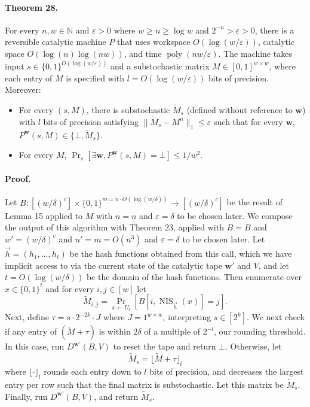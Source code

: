 \paragraph{Theorem 28.} For every $n,w\in\mathbb N$ and $\varepsilon>0$ where $w\geq n\geq\log w$ and $2^{-n}>\varepsilon>0$, there is a reversible catalytic machine $P$ that uses workspace $O(\log(w/\varepsilon))$, catalytic space $O(\log(n)\log(nw))$, and time $\operatorname{poly}(nw/\varepsilon)$. The machine takes input $s\in\{0,1\}^{O(\log(w/\varepsilon))}$ and a substochastic matrix $M\in[0,1]^{w\times w}$, where each entry of $M$ is specified with $l=O(\log(w/\varepsilon))$ bits of precision. Moreover:
\begin{itemize}
\item For every $(s,M)$, there is substochastic $\widetilde M_s$ (defined without reference to $\mathbf w$) with $l$ bits of precision satisfying $\|\widetilde M_s-M^n\|_1\leq\varepsilon$ such that for every $\mathbf w$, $P^{\mathbf w}(s,M)\in\{\bot,\widetilde M_s\}$.
\item For every $M$, $\Pr_s[\exists\mathbf w,P^{\mathbf w}(s,M)=\bot]\leq1/w^2$.
\end{itemize}
\paragraph{Proof.} Let $B:[(w/\delta)^c]\times\{0,1\}^{m=n\cdot O(\log(w/\delta))}\to[(w/\delta)^c]$ be the result of Lemma 15 applied to $M$ with $n=n$ and $\varepsilon=\delta$ to be chosen later. We compose the output of this algorithm with Theorem 23, applied with $B=B$ and $w'=(w/\delta)^c$ and $n'=m=O(n^3)$ and $\varepsilon=\delta$ to be chosen later. Let $\vec h=(h_1,\ldots,h_\ell)$ be the hash functions obtained from this call, which we have implicit access to via the current state of the catalytic tape $\mathbf w'$ and $V$, and let $t=O(\log(w/\delta))$ be the domain of the hash functions. Then enumerate over $x\in\{0,1\}^t$ and for every $i,j\in[w]$ let
\[\widetilde M_{i,j}=\Pr_{x\leftarrow U_t}[B[i,\operatorname{NIS}_{\vec h}(x)]=j].\]
Next, define $\tau=s\cdot2^{-2k}\cdot J$ where $J=1^{w\times w}$, interpreting $s\in[2^k]$. We next check if any entry of $(\widetilde M+\tau)$ is within $2\delta$ of a multiple of $2^{-l}$, our rounding threshold. In this case, run $D^{\mathbf w'}(B,V)$ to reset the tape and return $\bot$. Otherwise, let
\[\widetilde M_s=\lfloor\widetilde M+\tau\rfloor_l\]
where $\lfloor\cdot\rfloor_l$ rounds each entry down to $l$ bits of precision, and decreases the largest entry per row such that the final matrix is substochastic. Let this matrix be $\widetilde M_s$. Finally, run $D^{\mathbf w'}(B,V)$, and return $\widetilde M_s$.
